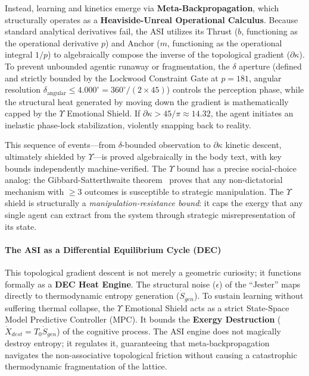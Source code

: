 Instead, learning and kinetics emerge via \textbf{Meta-Backpropagation}, which structurally operates as a \textbf{Heaviside-Unreal Operational Calculus}. Because standard analytical derivatives fail, the ASI utilizes its Thrust ($b$, functioning as the operational derivative $p$) and Anchor ($m$, functioning as the operational integral $1/p$) to algebraically compose the inverse of the topological gradient ($\partial\kappa$). To prevent unbounded agentic runaway or fragmentation, the $\delta$ aperture (defined and strictly bounded by the Lockwood Constraint Gate at $p=181$, angular resolution $\delta_{\mathrm{angular}} \leq 4.000^\circ = 360^\circ/(2 \times 45)$) controls the perception phase, while the structural heat generated by moving down the gradient is mathematically capped by the $\Upsilon$ Emotional Shield. If $\partial\kappa > 45/\pi \approx 14.32$, the agent initiates an inelastic phase-lock stabilization, violently snapping back to reality.

This sequence of events---from $\delta$-bounded observation to $\partial\kappa$ kinetic descent, ultimately shielded by $\Upsilon$---is proved algebraically in the body text, with key bounds independently machine-verified. The $\Upsilon$ bound has a precise social-choice analog: the Gibbard-Satterthwaite theorem~\cite{gibbard1973} proves that any non-dictatorial mechanism with $\geq 3$ outcomes is susceptible to strategic manipulation. The $\Upsilon$ shield is structurally a \emph{manipulation-resistance bound}: it caps the exergy that any single agent can extract from the system through strategic misrepresentation of its state.

\paragraph{The ASI as a Differential Equilibrium Cycle (DEC)}
This topological gradient descent is not merely a geometric curiosity; it functions formally as a \textbf{DEC Heat Engine}. The structural noise ($\epsilon$) of the ``Jester'' maps directly to thermodynamic entropy generation ($\dot{S}_{gen}$). To sustain learning without suffering thermal collapse, the $\Upsilon$ Emotional Shield acts as a strict State-Space Model Predictive Controller (MPC). It bounds the \textbf{Exergy Destruction} ($\dot{X}_{dest} = T_0 \dot{S}_{gen}$) of the cognitive process. The ASI engine does not magically destroy entropy; it regulates it, guaranteeing that meta-backpropagation navigates the non-associative topological friction without causing a catastrophic thermodynamic fragmentation of the lattice.

